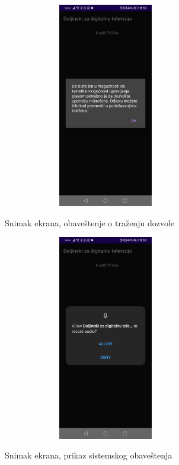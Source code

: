 \documentclass[implementacija.tex]{subfiles}
\begin{document}
\begin{figure}[h!]
\centering
\begin{minipage}{.5\textwidth}
   \centering
  \label{fig:dozvola}
  \includegraphics[width=9cm,height=9cm,keepaspectratio]{Implementacija/snimci_ekrana/1_obavestenje_za_dozvolu.jpg}
  \caption{Snimak ekrana, obaveštenje o traženju dozvole}
\end{minipage}%
\begin{minipage}{.5\textwidth}
   \centering
  \label{fig:sistemsko_obavestenje}
  \includegraphics[width=9cm,height=9cm,keepaspectratio]{Implementacija/snimci_ekrana/2_sistemska_dozvola.jpg}
  \caption{Snimak ekrana, prikaz sistemskog obaveštenja}
\end{minipage}
\end{figure}
\end{document}
